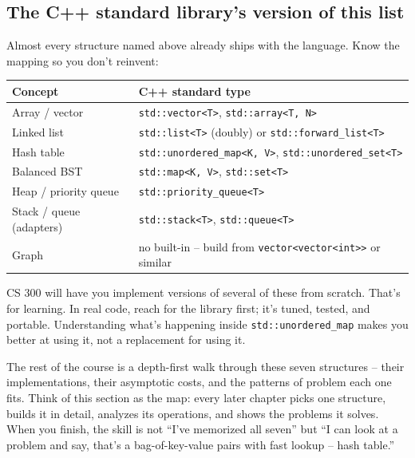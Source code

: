\documentclass[11pt]{article}
\begin{document}
\subsection{The C++ standard library's version of this list}

Almost every structure named above already ships with the language.
Know the mapping so you don't reinvent:

\begin{center}
\small
\begin{tabular}{ll}
\textbf{Concept} & \textbf{C++ standard type} \\
\hline
Array / vector & \texttt{std::vector<T>}, \texttt{std::array<T, N>} \\
Linked list & \texttt{std::list<T>} (doubly) or \texttt{std::forward\_list<T>} \\
Hash table & \texttt{std::unordered\_map<K, V>}, \texttt{std::unordered\_set<T>} \\
Balanced BST & \texttt{std::map<K, V>}, \texttt{std::set<T>} \\
Heap / priority queue & \texttt{std::priority\_queue<T>} \\
Stack / queue (adapters) & \texttt{std::stack<T>}, \texttt{std::queue<T>} \\
Graph & no built-in -- build from \texttt{vector<vector<int>>} or similar \\
\end{tabular}
\normalsize
\end{center}

\begin{notebox}
CS 300 will have you implement versions of several of these from
scratch. That's for learning. In real code, reach for the library
first; it's tuned, tested, and portable. Understanding what's
happening inside \texttt{std::unordered\_map} makes you better at
using it, not a replacement for using it.
\end{notebox}

\begin{ideabox}
The rest of the course is a depth-first walk through these seven
structures -- their implementations, their asymptotic costs, and the
patterns of problem each one fits. Think of this section as the map:
every later chapter picks one structure, builds it in detail,
analyzes its operations, and shows the problems it solves. When you
finish, the skill is not ``I've memorized all seven'' but ``I can
look at a problem and say, that's a bag-of-key-value pairs with fast
lookup -- hash table.''
\end{ideabox}
\end{document}
